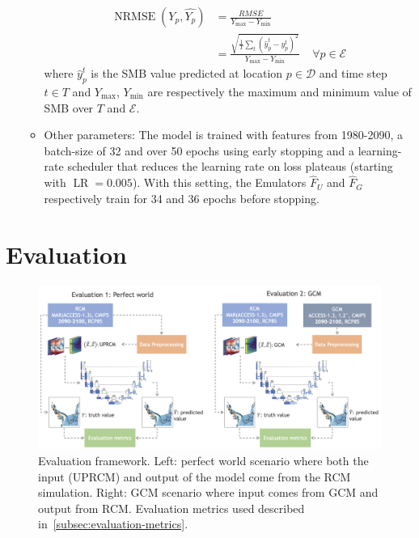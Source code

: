 \documentclass[a4paper,11pt,oneside]{report}
\begin{document}
\begin{itemize}
\begin{itemize}
        \begin{align}
        \operatorname{NRMSE}\left(Y_{p},\widehat{Y_{p}}\right) &= \frac{RMSE}{Y_{\max} - Y_{\min}} \\
         &=\frac{\sqrt{\frac{1}{T}\sum_{t}(\hat{y}_{p}^{t}-y^{t}_{p})^2}}{Y_{\max} - Y_{\min}}   \;\;\;\; \forall p \in \mathcal{E} 
        \end{align}
        where $\hat{y}_{p}^{t}$ is the SMB value predicted at location $p\in \mathcal{D} $ and time step $t\in T$ and $Y_{\max}$, $Y_{\min}$ are respectively the maximum and minimum value of SMB over $T$ and $\mathcal{E}$.
        \item Other parameters: The model is trained with features from 1980-2090, a batch-size of 32 and over 50 epochs using early stopping and a learning-rate scheduler that reduces the learning rate on loss plateaus (starting with $\operatorname{LR} = 0.005$). With this setting, the Emulators $\hat{F}_U$ and $\hat{F}_G$ respectively train for 34 and 36 epochs before stopping. 
    \end{itemize}
\end{itemize}

\section{Evaluation}\label{sec:evaluation}
\begin{figure}[!t]
  \centering
  \includegraphics[width=\columnwidth]{images/evaluation_framework.png}
  \caption []{\small Evaluation framework. Left: perfect world scenario where both the input (UPRCM) and output of the model come from the RCM simulation. Right: GCM scenario where input comes from GCM and output from RCM. Evaluation metrics used described in~\ref{subsec:evaluation-metrics}.}
  \vspace{-3mm}
  \label{fig:evaluation-framework}
\end{figure}
\end{document}
